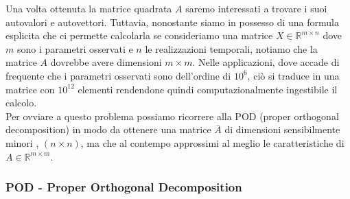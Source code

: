 \documentclass[11pt]{article}
\newcommand{\R}{\mathbb{R}} %
\begin{document}
Una volta ottenuta la matrice quadrata $A$ saremo interessati a trovare i suoi autovalori e autovettori. 
Tuttavia, nonostante siamo in possesso di una formula esplicita che ci permette calcolarla se consideriamo una matrice $X \in \mathbb{R}^{m \times n}$ dove $m$ sono i parametri osservati e $n$ le realizzazioni temporali, notiamo che la matrice $A$ dovrebbe avere dimensioni $m \times m$. Nelle applicazioni, dove accade di frequente che i parametri osservati sono dell'ordine di $10^6$, ciò si traduce in una matrice con $10^{12}$ elementi rendendone quindi computazionalmente ingestibile il calcolo.
\\
Per ovviare a questo problema possiamo ricorrere alla POD (proper orthogonal decomposition) in modo da ottenere una matrice $\bar{A}$ di dimensioni sensibilmente minori , $(n \times n)$, ma che al contempo approssimi al meglio le caratteristiche di $A \in \R^{m \times m}$.
\subsubsection{POD - Proper Orthogonal Decomposition}
\end{document}
